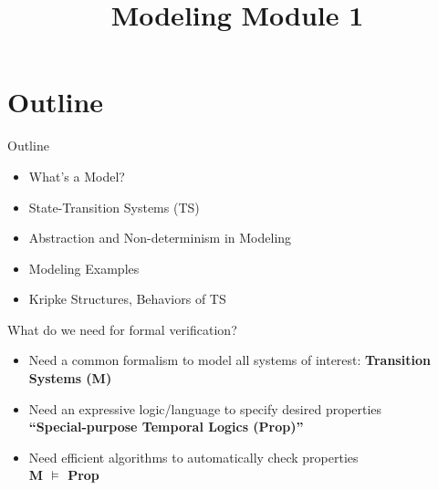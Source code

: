\documentclass{beamer}
\title{Modeling Module 1}
\begin{document}
\begin{frame}
  \titlepage
\end{frame}


\section{Outline}


\begin{frame}{Outline}
\begin{itemize}
\item What's a Model?

\item State-Transition Systems (TS)

\item Abstraction and Non-determinism in Modeling

\item Modeling Examples

\item Kripke Structures, Behaviors of TS
\end{itemize}
\end{frame}

\begin{frame}{What do we need for formal verification?}
\begin{itemize}
\item<1-> Need a common formalism to model all systems of interest:
\textbf{Transition Systems (M)}

\item<2-> Need an expressive logic/language to specify desired properties \\
\textbf{``Special-purpose Temporal Logics (Prop)''}

\item<3-> Need efficient algorithms to automatically check properties \\
\textbf{M $\models$ Prop}
\end{itemize}
\end{frame}
\end{document}
